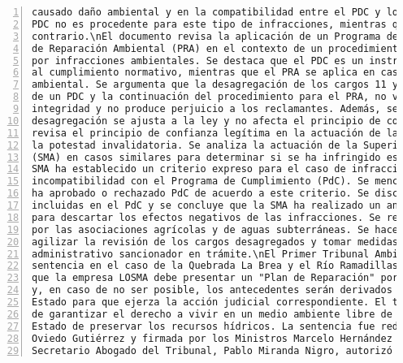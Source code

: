 \begin{Verbatim}[frame=lines, label=Elavoración propia -  Ejemplo de Contexto enviado por el Chatbot a OpenAI
				, fontsize=\scriptsize, numbers=left
				, baselinestretch=0.4
				, formatcom=\color{gray}]
causado daño ambiental y en la compatibilidad entre el PDC y los PRA. La SMA argumenta que el
PDC no es procedente para este tipo de infracciones, mientras que las reclamantes sostienen lo
contrario.\nEl documento revisa la aplicación de un Programa de Cumplimiento (PDC) y un Plan
de Reparación Ambiental (PRA) en el contexto de un procedimiento administrativo sancionatorio
por infracciones ambientales. Se destaca que el PDC es un instrumento voluntario de incentivo
al cumplimiento normativo, mientras que el PRA se aplica en casos de infracciones con daño
ambiental. Se argumenta que la desagregación de los cargos 11 y 12, que generó la aprobación
de un PDC y la continuación del procedimiento para el PRA, no vulnera el criterio de
integridad y no produce perjuicio a los reclamantes. Además, se señala que la decisión de
desagregación se ajusta a la ley y no afecta el principio de confianza legítima.\nEl artículo
revisa el principio de confianza legítima en la actuación de la administración como límite a
la potestad invalidatoria. Se analiza la actuación de la Superintendencia del Medio Ambiente
(SMA) en casos similares para determinar si se ha infringido este principio. Se destaca que la
SMA ha establecido un criterio expreso para el caso de infracciones con daño ambiental y su
incompatibilidad con el Programa de Cumplimiento (PdC). Se mencionan casos en los que la SMA
ha aprobado o rechazado PdC de acuerdo a este criterio. Se discute la eficacia de las medidas
incluidas en el PdC y se concluye que la SMA ha realizado un análisis razonable y motivado
para descartar los efectos negativos de las infracciones. Se rechaza la reclamación presentada
por las asociaciones agrícolas y de aguas subterráneas. Se hace un llamado a la SMA para
agilizar la revisión de los cargos desagregados y tomar medidas oportunas en el procedimiento
administrativo sancionador en trámite.\nEl Primer Tribunal Ambiental de Chile emitió una
sentencia en el caso de la Quebrada La Brea y el Río Ramadillas. En la sentencia, se establece
que la empresa LOSMA debe presentar un "Plan de Reparación" por los daños ambientales causados
y, en caso de no ser posible, los antecedentes serán derivados al Consejo de Defensa del
Estado para que ejerza la acción judicial correspondiente. El tribunal destaca la importancia
de garantizar el derecho a vivir en un medio ambiente libre de contaminación y el deber del
Estado de preservar los recursos hídricos. La sentencia fue redactada por el Ministro Mauricio
Oviedo Gutiérrez y firmada por los Ministros Marcelo Hernández Rojas y Juan Opazo Lagos. El
Secretario Abogado del Tribunal, Pablo Miranda Nigro, autorizó la notificación de la

\end{Verbatim}

